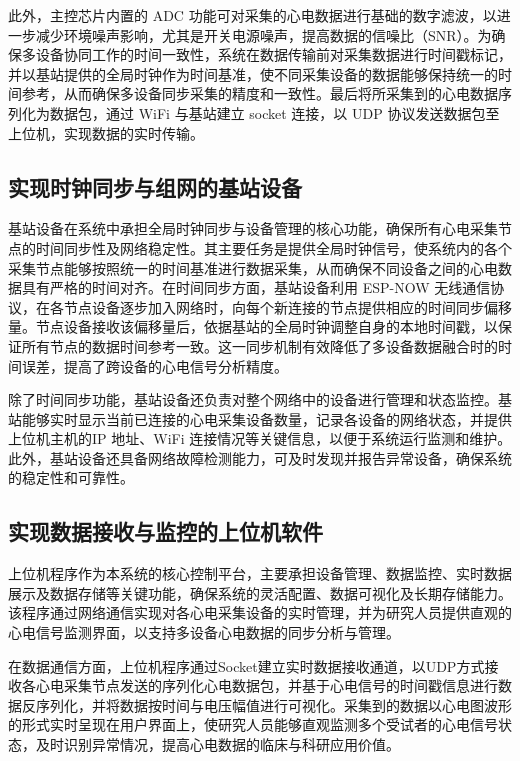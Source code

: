 此外，主控芯片内置的 ADC 功能可对采集的心电数据进行基础的数字滤波，以进一步减少环境噪声影响，尤其是开关电源噪声，提高数据的信噪比（SNR）。为确保多设备协同工作的时间一致性，系统在数据传输前对采集数据进行时间戳标记，并以基站提供的全局时钟作为时间基准，使不同采集设备的数据能够保持统一的时间参考，从而确保多设备同步采集的精度和一致性。最后将所采集到的心电数据序列化为数据包，通过 WiFi 与基站建立 socket 连接，以 UDP 协议发送数据包至上位机，实现数据的实时传输。

\subsection{实现时钟同步与组网的基站设备}

基站设备在系统中承担全局时钟同步与设备管理的核心功能，确保所有心电采集节点的时间同步性及网络稳定性。其主要任务是提供全局时钟信号，使系统内的各个采集节点能够按照统一的时间基准进行数据采集，从而确保不同设备之间的心电数据具有严格的时间对齐。在时间同步方面，基站设备利用 ESP-NOW 无线通信协议，在各节点设备逐步加入网络时，向每个新连接的节点提供相应的时间同步偏移量。节点设备接收该偏移量后，依据基站的全局时钟调整自身的本地时间戳，以保证所有节点的数据时间参考一致。这一同步机制有效降低了多设备数据融合时的时间误差，提高了跨设备的心电信号分析精度。

除了时间同步功能，基站设备还负责对整个网络中的设备进行管理和状态监控。基站能够实时显示当前已连接的心电采集设备数量，记录各设备的网络状态，并提供上位机主机的IP 地址、WiFi 连接情况等关键信息，以便于系统运行监测和维护。此外，基站设备还具备网络故障检测能力，可及时发现并报告异常设备，确保系统的稳定性和可靠性。

\subsection{实现数据接收与监控的上位机软件}

上位机程序作为本系统的核心控制平台，主要承担设备管理、数据监控、实时数据展示及数据存储等关键功能，确保系统的灵活配置、数据可视化及长期存储能力。该程序通过网络通信实现对各心电采集设备的实时管理，并为研究人员提供直观的心电信号监测界面，以支持多设备心电数据的同步分析与管理。

在数据通信方面，上位机程序通过Socket建立实时数据接收通道，以UDP方式接收各心电采集节点发送的序列化心电数据包，并基于心电信号的时间戳信息进行数据反序列化，并将数据按时间与电压幅值进行可视化。采集到的数据以心电图波形的形式实时呈现在用户界面上，使研究人员能够直观监测多个受试者的心电信号状态，及时识别异常情况，提高心电数据的临床与科研应用价值。

